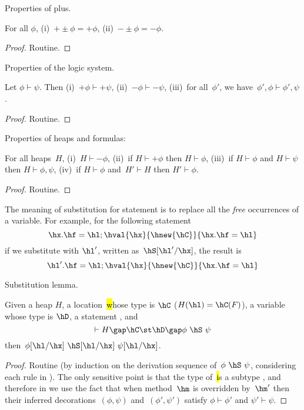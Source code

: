 Properties of plus.
\begin{lemma}
\label{Lemma:plus}
For all $\phi$,
    (i)~$+\pm\phi=+\phi$,
    (ii)~$-\pm\phi=-\phi$.
\end{lemma}
\begin{proof}
Routine.
\end{proof}



Properties of the logic system.
\begin{lemma}
\label{Lemma:logic}
Let $\phi \vdash \psi$.
Then
    (i)~$+\phi \vdash +\psi$,
    (ii)~$-\phi \vdash -\psi$,
    (iii)~for all~$\phi'$, we have~$\phi',\phi \vdash \phi',\psi$.
\end{lemma}
\begin{proof}
Routine.
\end{proof}



Properties of heaps and formulas:
\begin{lemma}
\label{Lemma:heaps}
For all heaps~$H$,
(i)~$H \vdash -\phi$,
(ii)~if $H \vdash +\phi$ then $H \vdash \phi$,
(iii)~if $H \vdash \phi$ and $H \vdash \psi$ then $H \vdash \phi,\psi$,
(iv)~if $H \vdash \phi$ and~$H' \vdash H$ then $H' \vdash \phi$.
\end{lemma}
\begin{proof}
Routine.
\end{proof}


The meaning of substitution for statement is to replace all the \emph{free} occurrences of a variable.
For example, for the following statement~\hS \[
\hx.\hf=\hl;\hval{\hx}{\hnew{\hC}}{\hx.\hf=\hl}
\]
if we substitute \hx with $\hl'$, written as~$\hS[\hl'/\hx]$, the result is \[
\hl'.\hf=\hl;\hval{\hx}{\hnew{\hC}}{\hx.\hf=\hl}
\]

Substitution lemma.
\begin{lemma}
\label{Lemma:substitution}
Given a heap $H$, a location~\hl whose type is $\hC$ ($H(\hl)=\hC(F)$), a variable \hx whose type is $\hD$, a statement \hS,
    and \[
    \vdash H \gap \hC \st \hD \gap \phi~\hS~\psi
    \] then~$\phi[\hl/\hx]~\hS[\hl/\hx]~\psi[\hl/\hx]$.
\end{lemma}
\begin{proof}
Routine (by induction on the derivation sequence of~$\phi~\hS~\psi$, considering each rule in ).
The only sensitive point is that the type of~\hl is a subtype \hx, and therefore in  we use the fact that when method~$\hm$ is overridden by~$\hm'$
    then their inferred decorations~$(\phi, \psi)$ and~$(\phi', \psi')$ satisfy $\phi \vdash \phi'$ and $\psi' \vdash \psi$.
\end{proof}


